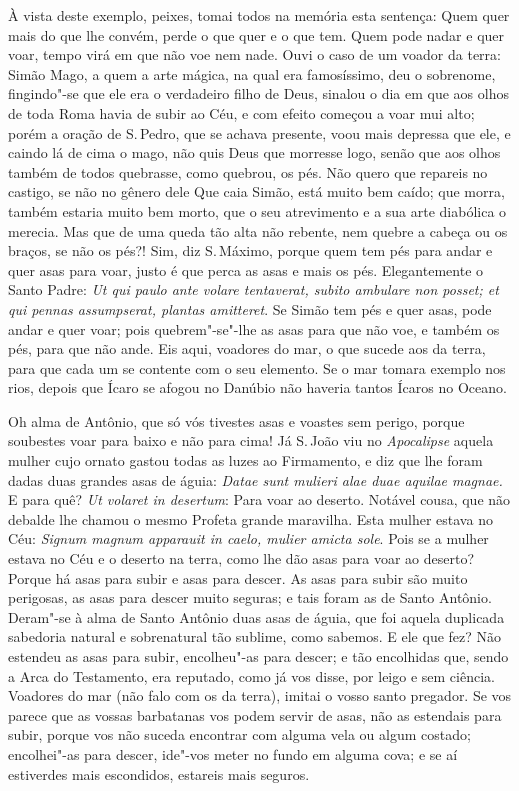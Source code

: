À vista deste exemplo, peixes, tomai todos na memória esta sentença:
Quem quer mais do que lhe convém, perde o que quer e o que tem. Quem
pode nadar e quer voar, tempo virá em que não voe nem nade. Ouvi o caso
de um voador da terra: Simão Mago, a quem a arte mágica, na qual era
famosíssimo, deu o sobrenome, fingindo"-se que ele era o verdadeiro filho
de Deus, sinalou o dia em que aos olhos de toda Roma havia de subir ao
Céu, e com efeito começou a voar mui alto; porém a oração de S.\,Pedro,
que se achava presente, voou mais depressa que
ele, e caindo lá de cima o mago, não quis Deus que morresse logo, senão
que aos olhos também de todos quebrasse, como quebrou, os pés.
Não quero que repareis no castigo, se não no gênero dele Que caia Simão,
está muito bem caído; que morra, também estaria muito bem morto, que o
seu atrevimento e a sua arte diabólica o merecia. Mas que de uma queda
tão alta não rebente, nem quebre a cabeça ou os braços, se não os pés?!
Sim, diz S.\,Máximo, porque quem tem pés para andar e quer asas para
voar, justo é que perca as asas e mais os pés. Elegantemente o Santo
Padre: \emph{Ut qui paulo ante volare tentaverat, subito ambulare non
posset; et qui pennas assumpserat, plantas amitteret}. Se Simão tem pés
e quer asas, pode andar e quer voar; pois quebrem"-se"-lhe as asas para
que não voe, e também os pés, para que não ande. Eis aqui, voadores do
mar, o que sucede aos da terra, para que cada um se contente com o seu
elemento. Se o mar tomara exemplo nos rios, depois que Ícaro se afogou
no Danúbio não haveria tantos Ícaros no Oceano.

Oh alma de Antônio, que só vós tivestes asas e voastes sem perigo,
porque soubestes voar para baixo e não para cima! Já S.\,João viu no
\emph{Apocalipse} aquela mulher cujo ornato gastou todas as luzes ao
Firmamento, e diz que lhe foram dadas duas grandes asas de águia:
\emph{Datae sunt mulieri alae duae aquilae magnae.} E para quê? \emph{Ut
volaret in desertum}: Para voar ao deserto. Notável cousa, que não
debalde lhe chamou o mesmo Profeta grande maravilha. Esta mulher estava
no Céu: \emph{Signum magnum apparauit in caelo, mulier amicta sole}.
Pois se a mulher estava no Céu e o deserto na terra, como lhe dão asas
para voar ao deserto? Porque há asas para subir e asas para descer. As
asas para subir são muito perigosas, as asas para descer muito seguras;
e tais foram as de Santo Antônio. Deram"-se à alma de Santo Antônio duas
asas de águia, que foi aquela duplicada sabedoria natural e sobrenatural
tão sublime, como sabemos. E ele que fez? Não estendeu as asas para
subir, encolheu"-as para descer; e tão encolhidas que, sendo a Arca do
Testamento, era reputado, como já vos disse, por leigo e sem ciência.
Voadores do mar (não falo com os da terra), imitai o vosso santo
pregador. Se vos parece que as vossas barbatanas vos podem servir de
asas, não as estendais para subir, porque vos não suceda encontrar com
alguma vela ou algum costado; encolhei"-as para descer, ide"-vos meter no
fundo em alguma cova; e se aí estiverdes mais escondidos, estareis mais
seguros.

